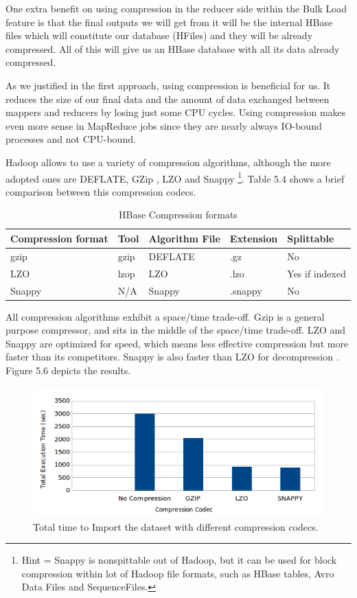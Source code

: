 One extra benefit on using compression in the reducer side within the Bulk Load feature is that the final outputs we will get from it will be the internal HBase files which will constitute our database (HFiles) and they will be already compressed. All of this will give us an HBase database with all its data already compressed.
\par
As we justified in the first approach, using compression is beneficial for us. It reduces the size of our final data and the amount of data exchanged between mappers and reducers by losing just some CPU cycles. Using compression makes even more sense in MapReduce jobs since they are nearly always IO-bound processes and not CPU-bound.
\bigskip
\par
Hadoop allows to use a variety of compression algorithms, although the more adopted ones are DEFLATE, GZip \cite{GZip}, LZO \cite{oberhumer2005lzo} and Snappy \cite{Snappy} \footnote{Hint = Snappy is nonspittable out of Hadoop, but it can be used for block compression within lot of Hadoop file formats, such as HBase tables, Avro Data Files and SequenceFiles.}. Table 5.4 shows a brief comparison between this compression codecs.
\begin{table}[htbp]

\begin{tabular}{|l|l|l|l|l|}
\hline
Compression format  & Tool  & Algorithm File  & Extension  & Splittable \\ \hline
gzip &  gzip  & DEFLATE  & .gz &  No \\ \hline
LZO &  lzop &  LZO  & .lzo &  Yes if indexed \\ \hline
Snappy  & N/A  & Snappy  & .snappy  & No \\ \hline
\end{tabular}
\label{}
\caption{HBase Compression formats}
\end{table}


All compression algorithms exhibit a space/time trade-off. Gzip is a general purpose compressor, and sits in the middle of the space/time trade-off. LZO and Snappy are optimized for speed, which means less effective compression but more faster than its competitors. Snappy is also faster than LZO for decompression \cite{CompressionHadoop}. Figure 5.6 depicts the results.


\begin{figure}[htb]
\centering
\includegraphics[width=1\textwidth,height=0.31\textheight]{./images/codecs1.png}
\caption{Total time to Import the dataset with different compression codecs.} \label{fig:codecs}
\end{figure}


